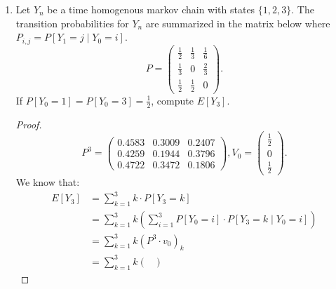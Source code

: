 \documentclass[a4paper]{article}
\begin{document}
\begin{enumerate}
\begin{proof}
    $\{X_n\} $ is a markov chain because at every time $X_n$,  
    \begin{align*}
      P[X_n = S_j \mid X_{n-1} = S_{j_{n-1}}, \ldots, X_{0} = S_{j_{0}}] &= P[X_n = S_j \mid X_{n-1} = S_{j_{n-1}}]\\ &= \begin{cases}
      \frac{n-j_{n-1}}{n}, S_{j} = S_{j_{n-1}} + 1 \\
      \frac{j_{n-1}}{n}, S_{j} = S_{j_{n-1}} - 1 \\
      0, \text{ otherwise}
    \end{cases}
    .\end{align*} By construction, the probability of the next state is only dependent on the previous state. Thus, since it's a stochastic process (since $X_k$ are timesteps) with the above property, then  $\{X_n\} $ is a markov chain. 
  \end{proof}
\item  Let $Y_n$ be a time homogenous markov chain with states  $\{1,2,3\}$. The transition probabilities for $Y_n$ are summarized in the matrix below where  $P_{i,j} = P[Y_1 = j \mid  Y_0 = i]$. 
  \[
    P = \begin{pmatrix}
\frac{1}{2} & \frac{1}{3} & \frac{1}{6} \\
\frac{1}{3} & 0 & \frac{2}{3} \\
\frac{1}{2} & \frac{1}{2} & 0
\end{pmatrix}
  .\] 
  If $P[Y_0=1] = P[Y_0 =3] = \frac{1}{2}$, compute $E[Y_3]$. 
  \begin{proof}
   \[
   P^3 = \begin{pmatrix}
0.4583 & 0.3009 & 0.2407 \\
0.4259 & 0.1944 & 0.3796 \\
0.4722 & 0.3472 & 0.1806
\end{pmatrix}, V_0 = \begin{pmatrix} 
\frac{1}{2}\\
0 \\
\frac{1}{2}
\end{pmatrix} 
   .\] 
   We know that:
   \begin{align*}
     E[Y_3] &= \sum_{k=1}^{3} k \cdot P[Y_3 = k] \\
            &= \sum_{k=1}^{3} k (\sum_{i=1}^{3} P[Y_0=i] \cdot P[Y_3=k\mid Y_0 = i])\\
            &= \sum_{k=1}^{3} k \left( P^{3} \cdot v_0 \right)_{k}  \\
            &=  \sum_{k=1}^{3} k  \begin{pmatrix}

\end{pmatrix}
\end{align*}
\end{proof}
\end{enumerate}
\end{document}
